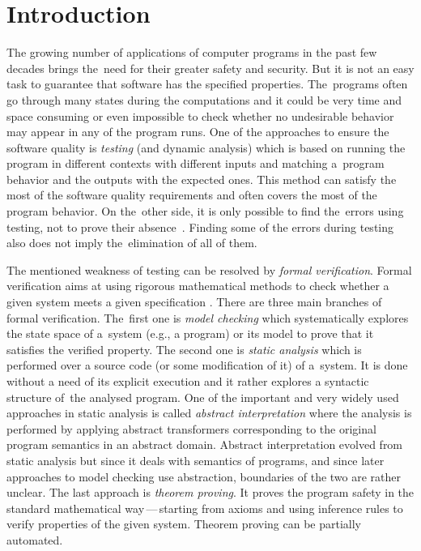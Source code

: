 \chapter{Introduction}

The growing number of applications of computer programs in the past few decades brings
the~need for their greater safety and security.
But it is not an easy task to guarantee that software has the specified properties.
The~programs often go through many states during the computations
and it could be very time and space consuming or even impossible to check whether no undesirable behavior
may appear in any of the program runs.
One of the approaches to ensure the software quality is \emph{testing} (and dynamic analysis) which is based
on running the program in different contexts with different inputs
and matching a~program behavior and the outputs with the expected ones.
This method can satisfy the most of the software quality requirements and often covers the most of the program behavior.
On the~other side, it is only possible to find the~errors using testing, not to prove their absence~\cite{dijkstra}.
Finding some of the errors during testing also does not imply the~elimination of all of them.

The mentioned weakness of testing can be resolved by \emph{formal verification}.
Formal verification aims at using rigorous mathematical methods to check whether a given system meets a given specification \cite{fav:lecture}.
There are three main branches of formal verification.
The~first one is \emph{model checking} which systematically explores the state space of a~system (e.g., a program) or its model to
prove that it satisfies the verified property.
The second one is \emph{static analysis} which is performed over a source code (or some modification of it) of a~system.
It is done without a need of its explicit execution and it rather explores a syntactic structure of~the analysed program.
One of the important and very widely used approaches in static analysis is called \emph{abstract interpretation} where the analysis is performed by
applying abstract transformers corresponding to the original program semantics in an abstract domain.
Abstract interpretation evolved from static analysis
but since it deals with semantics of programs,
and since later approaches to model checking use abstraction,
boundaries of the two are rather unclear.
The last approach is \emph{theorem proving}.
It proves the program safety in the standard mathematical way\,---\,starting
from axioms and using inference rules to verify properties of the given system.
Theorem proving can be partially automated.

